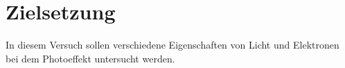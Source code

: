 \section{Zielsetzung}

\label{sec:Zielsetzung}

In diesem Versuch sollen verschiedene Eigenschaften von Licht und Elektronen bei dem
Photoeffekt untersucht werden.

